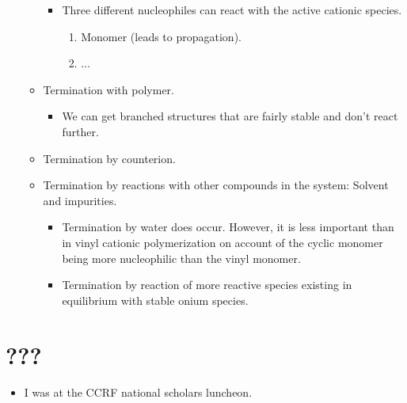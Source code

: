 \documentclass[../notes.tex]{subfiles}
\begin{document}
\begin{itemize}
\begin{itemize}
        \begin{itemize}
            \item Three different nucleophiles can react with the active cationic species.
            \begin{enumerate}
                \item Monomer (leads to propagation).
                \item ...
            \end{enumerate}
        \end{itemize}
        \item Termination with polymer.
        \begin{itemize}
            \item We can get branched structures that are fairly stable and don't react further.
        \end{itemize}
        \item Termination by counterion.
        \item Termination by reactions with other compounds in the system: Solvent and impurities.
        \begin{itemize}
            \item Termination by water does occur. However, it is less important than in vinyl cationic polymerization on account of the cyclic monomer being more nucleophilic than the vinyl monomer.
            \item Termination by reaction of more reactive species existing in equilibrium with stable onium species.
        \end{itemize}
    \end{itemize}
\end{itemize}



\section{???}
\begin{itemize}
    \item {}I was at the CCRF national scholars luncheon.
\end{itemize}
\end{document}
